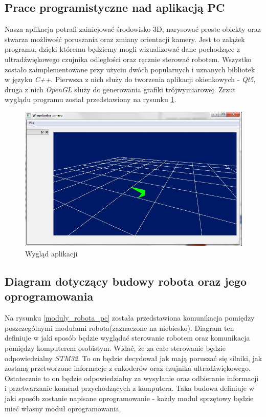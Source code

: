 \documentclass[a4paper]{article}
\begin{document}
\subsection{Prace programistyczne nad aplikacją PC}

Nasza aplikacja potrafi zainicjować środowisko 3D, narysować proste obiekty oraz stwarza możliwość poruszania oraz zmiany orientacji kamery. Jest to zalążek programu, dzięki któremu będziemy mogli wizualizować dane pochodzące z ultradźwiękowego czujnika odległości oraz ręcznie sterować robotem. Wszystko zostało zaimplementowane przy użyciu dwóch popularnych i uznanych bibliotek w języku \textit{C++}. Pierwsza z nich służy do tworzenia aplikacji okienkowych - \textit{Qt5}, druga z nich \textit{OpenGL} służy do generowania grafiki trójwymiarowej. Zrzut wyglądu programu został przedstawiony na rysunku \ref{aplikacja}.

\begin{figure}
\centering
\includegraphics[width=\linewidth]{aplikacja}
\caption{Wygląd aplikacji}
\label{aplikacja}
\end{figure}


\subsection{Diagram dotyczący budowy robota oraz jego oprogramowania}

Na rysunku \ref{moduly_robota_pc} została przedstawiona komunikacja pomiędzy poszczególnymi modułami robota(zaznaczone na niebiesko). Diagram ten definiuje w jaki sposób będzie wyglądać sterowanie robotem oraz komunikacja pomiędzy komputerem osobistym. Widać, że za całe sterowanie będzie odpowiedzialny \textit{STM32}. To on będzie decydował jak mają poruszać się silniki, jak zostaną przetworzone informacje z enkoderów oraz czujnika ultradźwiękowego. Ostatecznie to on będzie odpowiedzialny za wysyłanie oraz odbieranie informacji i przetwarzanie komend przychodzących z komputera. Taka budowa definiuje w jaki sposób zostanie napisane oprogramowanie - każdy moduł sprzętowy będzie mieć własny moduł oprogramowania.
\end{document}
